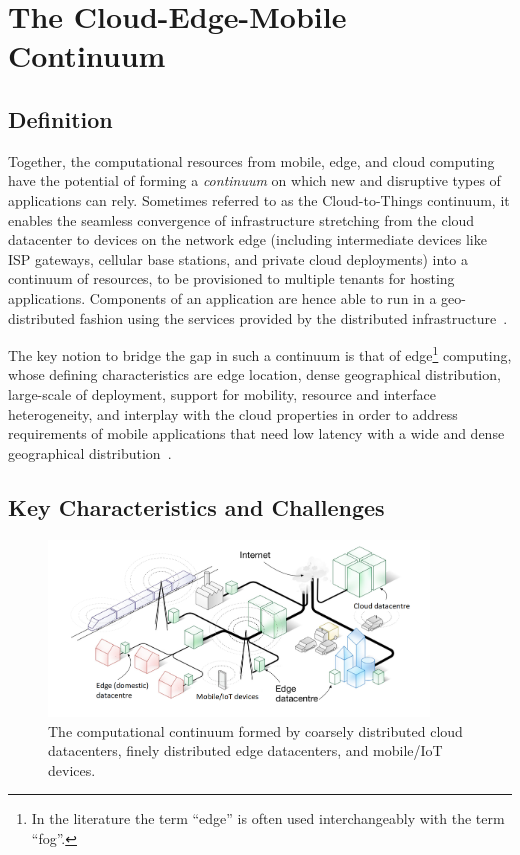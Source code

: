\section{The Cloud-Edge-Mobile Continuum}\label{sec:continuum}

\subsection{Definition}

Together, the computational resources from mobile, edge, and cloud computing have the potential of forming a \textit{continuum} on which new and disruptive types of applications can rely. Sometimes referred to as the Cloud-to-Things continuum, it enables the seamless convergence of infrastructure stretching from the cloud datacenter to devices on the network edge (including intermediate devices like ISP gateways, cellular base stations, and private cloud deployments) into a continuum of resources, to be provisioned to multiple tenants for hosting applications. Components of an application are hence able to run in a geo-distributed fashion using the services provided by the distributed infrastructure~\cite{GuptaIfogSim17}. 

The key notion to bridge the gap in such a continuum is that of edge\footnote{In the literature the term ``edge'' is often used interchangeably with the term ``fog''.} computing, whose defining characteristics are edge location, dense geographical distribution, large-scale of deployment, support for mobility, resource and interface heterogeneity, and interplay with the cloud properties in order to address requirements of mobile applications that need low latency with a wide and dense geographical distribution~\cite{Bonomi2014}.  


\subsection{Key Characteristics and Challenges}

\begin{figure}[tbp]
	\includegraphics[width=0.9\textwidth]{figs/Continuum-overall.png}
	\caption{The computational continuum formed by coarsely distributed cloud datacenters, finely distributed edge datacenters, and mobile/IoT devices.}
	\label{fig:continuum-overral}
\end{figure}

